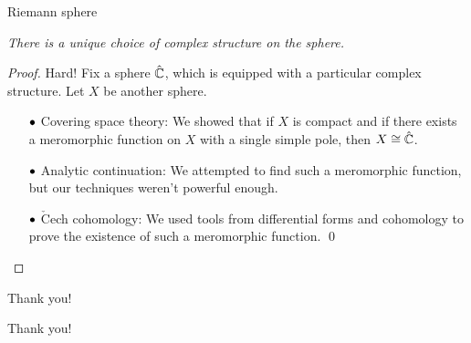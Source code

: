 \documentclass{beamer}
\begin{document}
    \begin{frame}{Riemann sphere}
        \begin{theorem}[Uniformization]
            \textit{There is a unique choice of complex structure on the sphere.}
        \end{theorem}

        \pause

        \begin{proof}
            Hard!
            \pause
            Fix a sphere $\hat{\mathbb{C}}$, which is equipped with a particular complex structure. Let $X$ be another sphere.
            \pause
            \begin{itemize}
                \item[\scriptsize$\bullet$] \scriptsize Covering space theory: We showed that if $X$ is compact and if there exists a meromorphic function on $X$ with a single simple pole, then $X\cong\hat{\mathbb{C}}$.
                    \pause
                \item[\scriptsize$\bullet$] \scriptsize Analytic continuation: We attempted to find such a meromorphic function, but our techniques weren't powerful enough.
                    \pause
                \item[\scriptsize$\bullet$] \scriptsize $\check{\textrm{C}}$ech cohomology: We used tools from differential forms and cohomology to prove the existence of such a meromorphic function.
                    \pause\qed
            \end{itemize}
        \end{proof}
    \end{frame}
    \begin{frame}{Thank you!}
        \begin{center}
            Thank you!
        \end{center}
    \end{frame}
\end{document}

